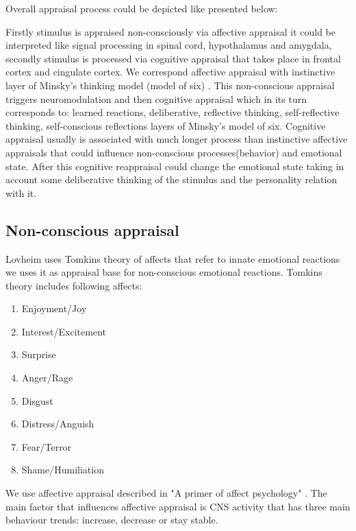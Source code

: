 Overall appraisal process could be depicted like presented below:


Firstly stimulus is appraised non-consciously via affective appraisal it could be interpreted like signal processing in spinal cord, hypothalamus and amygdala, secondly stimulus is processed via cognitive appraisal that takes place in frontal cortex and cingulate cortex. We correspond affective appraisal with instinctive layer of Minsky's thinking model (model of six) \cite{emotionmachine}. This non-conscious appraisal triggers neuromodulation \cite{cubeofemotions} and then cognitive appraisal which in its turn corresponds to: learned reactions, deliberative, reflective thinking, self-reflective thinking, self-conscious reflections layers of Minsky's model of six. Cognitive appraisal usually is associated with much longer process than instinctive affective appraisals that could influence non-conscious processes(behavior) and emotional state. After this cognitive reappraisal could change the emotional state taking in account some deliberative thinking of the stimulus and the personality relation with it.

\subsection{Non-conscious appraisal}

Lovheim uses Tomkins theory of affects that refer to innate emotional reactions we uses it as appraisal base for non-conscious emotional reactions. Tomkins theory \cite{tomkins1, tomkins2, tomkins3, quest} includes following affects:

\begin{enumerate}
\item  Enjoyment/Joy
\item  Interest/Excitement
\item  Surprise
\item  Anger/Rage
\item  Disgust
\item  Distress/Anguish
\item  Fear/Terror
\item  Shame/Humiliation
\end{enumerate}

We use affective appraisal described in "A primer of affect psychology" \cite{primer_affect_psychology}. The main factor that influences affective appraisal is CNS activity that has three main behaviour trends: increase, decrease or stay stable.


